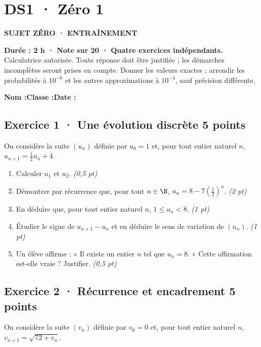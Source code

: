 \clearpage{}\label{sujet:1-1}

\section*{DS1 · Zéro 1}

{\sffamily\bfseries\color{teal}SUJET ZÉRO · ENTRAÎNEMENT\par}

\textbf{Durée : 2 h · Note sur 20 · Quatre exercices indépendants.}\\Calculatrice autorisée. Toute réponse doit être justifiée ; les démarches incomplètes seront prises en compte. Donner les valeurs exactes ; arrondir les probabilités à $10^{-6}$ et les autres approximations à $10^{-4}$, sauf précision différente.

\smallskip\textbf{Nom :}\enspace\dotfill\quad\textbf{Classe :}\enspace\dotfill\quad\textbf{Date :}\enspace\dotfill

\subsection*{Exercice 1 · Une évolution discrète \hfill 5 points}On considère la suite $(u_n)$ définie par $u_0=1$ et, pour tout entier naturel $n$, $u_{n+1}=\frac{1}{2}u_n+4$.

\begin{enumerate}

\item Calculer $u_1$ et $u_2$. \hfill\textit{(0,5 pt)}

\item Démontrer par récurrence que, pour tout $n\in\N$, $u_n=8-7\left(\frac{1}{2}\right)^n$. \hfill\textit{(2 pt)}

\item En déduire que, pour tout entier naturel $n$, $1\le u_n<8$. \hfill\textit{(1 pt)}

\item Étudier le signe de $u_{n+1}-u_n$ et en déduire le sens de variation de $(u_n)$. \hfill\textit{(1 pt)}

\item Un élève affirme : « Il existe un entier $n$ tel que $u_n=8$. » Cette affirmation est-elle vraie ? Justifier. \hfill\textit{(0,5 pt)}

\end{enumerate}

\subsection*{Exercice 2 · Récurrence et encadrement \hfill 5 points}On considère la suite $(v_n)$ définie par $v_0=0$ et, pour tout entier naturel $n$, $v_{n+1}=\sqrt{72+v_n}$.

